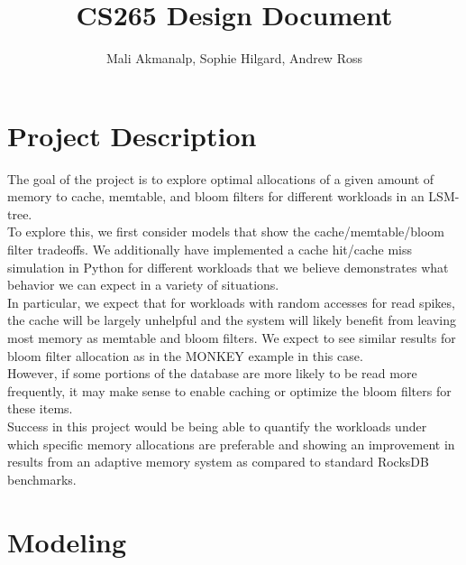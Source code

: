 \documentclass[11pt]{article}
\theoremstyle{plain}
\theoremstyle{definition}
\begin{document}
 


\title{CS265 Design Document}
\author{Mali Akmanalp, Sophie Hilgard, Andrew Ross}
\maketitle

\section{Project Description}
The goal of the project is to explore optimal allocations of a given amount of memory to cache, memtable, and bloom filters for different workloads in an LSM-tree. \\
To explore this, we first consider models that show the cache/memtable/bloom filter tradeoffs. We additionally have implemented a cache hit/cache miss simulation in Python for different workloads that we believe demonstrates what behavior we can expect in a variety of situations. \\
In particular, we expect that for workloads with random accesses for read spikes, the cache will be largely unhelpful and the system will likely benefit from leaving most memory as memtable and bloom filters. We expect to see similar results for bloom filter allocation as in the MONKEY example in this case. \\
However, if some portions of the database are more likely to be read more frequently, it may make sense to enable caching or optimize the bloom filters for these items.\\
Success in this project would be being able to quantify the workloads under which specific memory allocations are preferable and showing an improvement in results from an adaptive memory system as compared to standard RocksDB benchmarks.

\section{Modeling}
\end{document}
